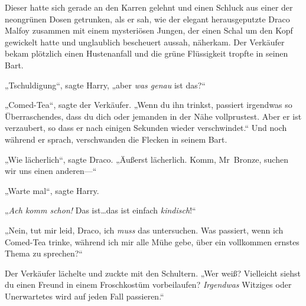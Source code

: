 Dieser hatte sich gerade an den Karren gelehnt und einen Schluck aus einer der neongrünen Dosen getrunken, als er sah, wie der elegant herausgeputzte Draco Malfoy zusammen mit einem mysteriösen Jungen, der einen Schal um den Kopf gewickelt hatte und unglaublich bescheuert aussah, näherkam. Der Verkäufer bekam plötzlich einen Hustenanfall und die grüne Flüssigkeit tropfte in seinen Bart.

„Tschuldigung“, sagte Harry, „aber \emph{was genau} ist das?“

„Comed-Tea“, sagte der Verkäufer. „Wenn du ihn trinkst, passiert irgendwas so Überraschendes, dass du dich oder jemanden in der Nähe vollprustest. Aber er ist verzaubert, so dass er nach einigen Sekunden wieder verschwindet.“ Und noch während er sprach, verschwanden die Flecken in seinem Bart.

„Wie lächerlich“, sagte Draco. „Äußerst lächerlich. Komm, Mr~Bronze, suchen wir uns einen anderen—“

„Warte mal“, sagte Harry.

„\emph{Ach komm schon!} Das ist…das ist einfach \emph{kindisch}!“

„Nein, tut mir leid, Draco, ich \emph{muss} das untersuchen. Was passiert, wenn ich Comed-Tea trinke, während ich mir alle Mühe gebe, über ein vollkommen ernstes Thema zu sprechen?“

Der Verkäufer lächelte und zuckte mit den Schultern. „Wer weiß? Vielleicht siehst du einen Freund in einem Froschkostüm vorbeilaufen? \emph{Irgendwas} Witziges oder Unerwartetes wird auf jeden Fall passieren.“

